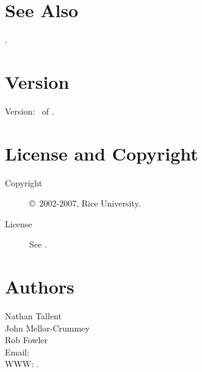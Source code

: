 \documentclass[english]{article}
\begin{document}

\section{See Also}

.

\section{Version}

Version: \Version\ of \Date.

\section{License and Copyright}

\begin{description}
\item[Copyright] \copyright\ 2002-2007, Rice University.
\item[License] See .
\end{description}

\section{Authors}

\noindent
Nathan Tallent \\
John Mellor-Crummey \\
Rob Fowler \\
Email:  \\
WWW: .

\LatexManEnd
\end{document}
